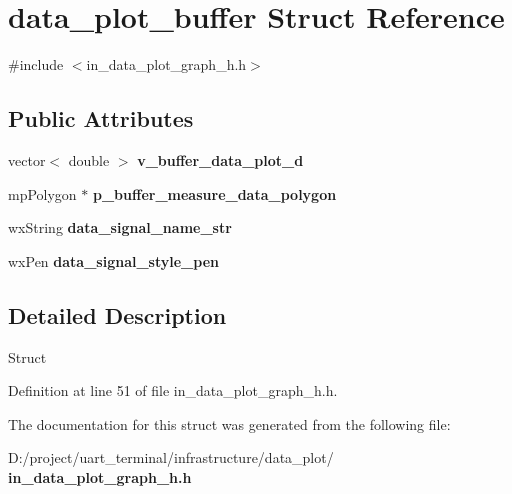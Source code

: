 \section{data\+\_\+plot\+\_\+buffer Struct Reference}
\label{structdata__plot__buffer}


{\ttfamily \#include $<$in\+\_\+data\+\_\+plot\+\_\+graph\+\_\+h.\+h$>$}

\subsection*{Public Attributes}
\begin{DoxyCompactItemize}
\item 
vector$<$ double $>$ {\bfseries v\+\_\+buffer\+\_\+data\+\_\+plot\+\_\+d}
\item 
mp\+Polygon $\ast$ {\bfseries p\+\_\+buffer\+\_\+measure\+\_\+data\+\_\+polygon}
\item 
wx\+String {\bfseries data\+\_\+signal\+\_\+name\+\_\+str}
\item 
wx\+Pen {\bfseries data\+\_\+signal\+\_\+style\+\_\+pen}
\end{DoxyCompactItemize}


\subsection{Detailed Description}
Struct 

Definition at line 51 of file in\+\_\+data\+\_\+plot\+\_\+graph\+\_\+h.\+h.



The documentation for this struct was generated from the following file\+:\begin{DoxyCompactItemize}
\item 
D\+:/project/uart\+\_\+terminal/infrastructure/data\+\_\+plot/\textbf{ in\+\_\+data\+\_\+plot\+\_\+graph\+\_\+h.\+h}\end{DoxyCompactItemize}
